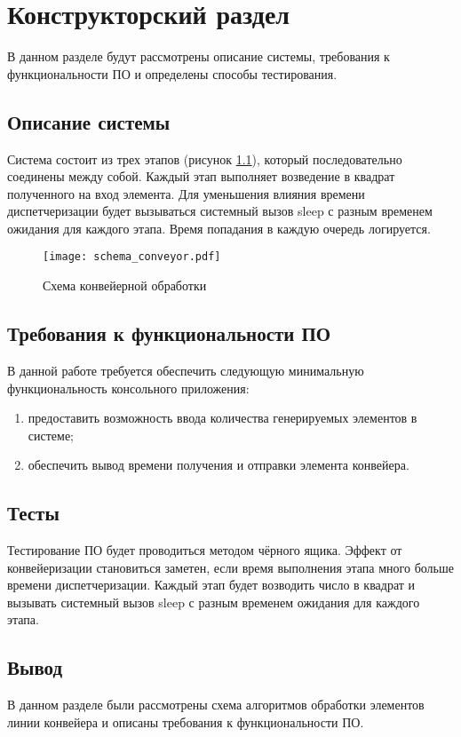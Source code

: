 \chapter{ Конструкторский раздел}
\label{cha:design}
        В данном разделе будут рассмотрены описание системы, требования к функциональности ПО
        и определены способы тестирования.
    \section{Описание системы}
        Система состоит из трех этапов (рисунок \ref{schema:conveyor}),
        который последовательно соединены между собой. 
        Каждый этап выполняет возведение в квадрат
        полученного на вход элемента. 
        Для уменьшения влияния времени диспетчеризации 
        будет вызываться системный вызов sleep 
        с разным временем ожидания для каждого этапа.
        Время попадания в каждую очередь логируется.

    \begin{figure}[h!]
        \centering
            \texttt{[image: schema\_conveyor.pdf]}
            \caption{Схема конвейерной обработки}
            \label{schema:conveyor}
    \end{figure}


    \section{Требования к функциональности ПО}
        В данной работе требуется обеспечить следующую минимальную функциональность консольного приложения:
        \begin{enumerate}
            \item предоставить возможность ввода количества генерируемых элементов в системе;
            \item обеспечить вывод времени получения и отправки элемента конвейера.
        \end{enumerate}

    \section{Тесты}
        Тестирование ПО будет проводиться методом чёрного ящика. 
        Эффект от конвейеризации становиться заметен,
        если время выполнения этапа много больше времени диспетчеризации. 
        Каждый этап будет возводить число в квадрат и вызывать системный вызов sleep 
        с разным временем ожидания для каждого этапа.

    \section{Вывод}
        В данном разделе были рассмотрены схема алгоритмов 
        обработки элементов линии конвейера и
        описаны требования к функциональности ПО.
        

\newpage